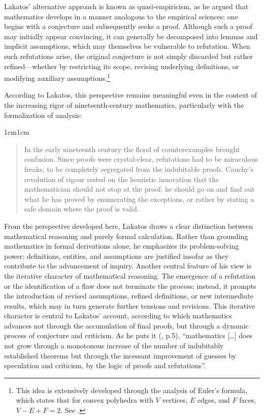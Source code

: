 \documentclass[11pt,a4paper]{article}
\begin{document}
Lakatos’ alternative approach is known as quasi-empiricism, as he argued that mathematics develops in a manner analogous to the empirical sciences: one begins with a conjecture and subsequently seeks a proof. Although such a proof may initially appear convincing, it can generally be decomposed into lemmas and implicit assumptions, which may themselves be vulnerable to refutation. When such refutations arise, the original conjecture is not simply discarded but rather refined—whether by restricting its scope, revising underlying definitions, or modifying auxiliary assumptions.\footnote{This idea is extensively developed through the analysis of Euler's formula, which states that for convex polyhedra with $V$ vertices, $E$ edges, and $F$ faces, $V - E + F = 2$. See \textcite[pp. 10–41]{Lakatos1976}.}

According to Lakatos, this perspective remains meaningful even in the context of the increasing rigor of nineteenth-century mathematics, particularly with the formalization of analysis:

\begin{adjustwidth}{1cm}{1cm}
\small
\begin{quote}
In the early nineteenth century the flood of counterexamples brought confusion. Since proofs were crystal-clear, refutations had to be miraculous freaks, to be completely segregated from the indubitable proofs. Cauchy’s revolution of rigour rested on the heuristic innovation that the mathematician should not stop at the proof: he should go on and find out what he has proved by enumerating the exceptions, or rather by stating a safe domain where the proof is valid.\parencite[p. 55]{Lakatos1976}
\end{quote}
\end{adjustwidth}

From the perspective developed here, Lakatos draws a clear distinction between mathematical reasoning and purely formal calculation. Rather than grounding mathematics in formal derivations alone, he emphasizes its problem-solving power: definitions, entities, and assumptions are justified insofar as they contribute to the advancement of inquiry. Another central feature of his view is the iterative character of mathematical reasoning. The emergence of a refutation or the identification of a flaw does not terminate the process; instead, it prompts the introduction of revised assumptions, refined definitions, or new intermediate results, which may in turn generate further tensions and revisions. This iterative character is central to Lakatos’ account, according to which mathematics advances not through the accumulation of final proofs, but through a dynamic process of conjecture and criticism. As he puts it (\citeyear{Lakatos1976}, p.5), “mathematics [\dots] does not grow through a monotonous increase of the number of indubitably established theorems but through the incessant improvement of guesses by speculation and criticism, by the logic of proofs and refutations”.
\end{document}
